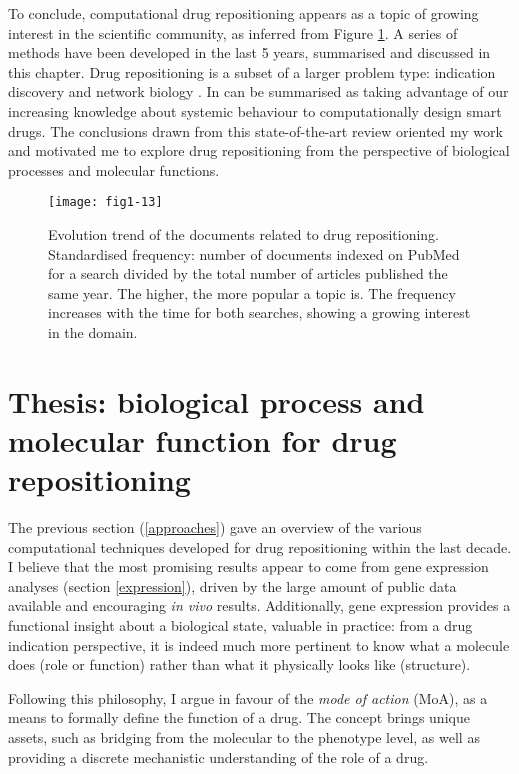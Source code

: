 To conclude, computational drug repositioning appears as a topic of growing interest in the scientific community, as inferred from Figure \ref{fig1-13}. A series of methods have been developed in the last 5 years, summarised and discussed in this chapter. Drug repositioning is a subset of a larger problem type: indication discovery and network biology \citep{hopkins2008network}. In can be summarised as taking advantage of our increasing knowledge about systemic behaviour to computationally design smart drugs.
The conclusions drawn from this state-of-the-art review oriented my work and motivated me to explore drug repositioning from the perspective of biological processes and molecular functions.

\begin{figure}[ht]
    \centering
    \texttt{[image: fig1-13]}
    \caption{Evolution trend of the documents related to drug repositioning. Standardised frequency: number of documents indexed on PubMed for a search divided by the total number of articles published the same year. The higher, the more popular a topic is. The  frequency increases with the time for both searches, showing a growing interest in the domain.}
    \label{fig1-13}
\end{figure}


\section{Thesis: biological process and molecular function for drug repositioning}

The previous section (\ref{approaches}) gave an overview of the various computational techniques developed for drug repositioning within the last decade. I believe that the most promising results appear to come from gene expression analyses (section \ref{expression}), driven by the large amount of public data available and encouraging \emph{in vivo} results. Additionally, gene expression provides a functional insight about a biological state, valuable in practice: from a drug indication perspective, it is indeed much more pertinent to know what a molecule does (role or function) rather than what it physically looks like (structure).

Following this philosophy, I argue in favour of the \emph{mode of action} (MoA), as a means to formally define the function of a drug. The concept brings unique assets, such as bridging from the molecular to the phenotype level, as well as providing a discrete mechanistic understanding of the role of a drug.

